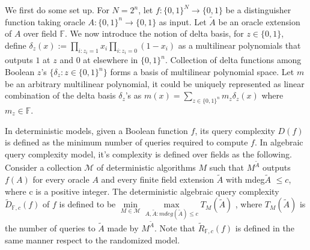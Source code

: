 \documentclass{article}
\begin{document}
  We first do some set up. For $N=2^n$, let $f:\{0,1\}^N\rightarrow\{0,1\}$ be a distinguisher function taking oracle $A: \{0,1\}^n \rightarrow \{0,1\}$ as input. Let $\tilde{A}$ be an oracle extension of $A$ over field $\mathbb{F}$. We now introduce the notion of delta basis, for $z\in\{0,1\}$, define $\delta_z(x) := \prod\limits_{i:z_i=1}x_i \prod\limits_{i:z_i=0}(1-x_i)$ as a multilinear polynomials that outputs $1$ at $z$ and $0$ at elsewhere in $\{0,1\}^n$. Collection of delta functions among Boolean $z$'s $\{\delta_z:z\in\{0,1\}^n\}$ forms a basis of multilinear polynomial space. Let $m$ be an arbitrary multilinear polynomial, it could be uniquely represented as linear combination of the delta basis $\delta_z$'s as $m(x) = \sum\limits_{z\in \{0,1\}^n}m_z\delta_z(x)$ where $m_z\in\mathbb{F}$.
  
  In deterministic models, given a Boolean function $f$, its query complexity $D(f)$ is defined as the minimum number of queries required to compute $f$. In algebraic query complexity model, it's complexity is defined over fields as the following. Consider a collection $\mathcal{M}$ of deterministic algorithms $M$ such that $M^{\tilde{A}}$ outputs $f(A)$ for every oracle $A$ and every finite field extension $\tilde{A}$ with mdeg{$\tilde{A}$} $\le c$, where c is a positive integer. The deterministic algebraic query complexity $\tilde{D}_{\mathbb{F},c}(f)$ of $f$ is defined to be $\min\limits_{M \in \mathcal{M}} \max\limits_{A,\tilde{A}: mdeg(\tilde{A}) \le c} T_M(\tilde{A})$ , where $T_M(\tilde{A})$ is the number of queries to $\tilde{A}$ made by $M^{\tilde{A}}$. Note that $\tilde{R}_{\mathbb{F},c}(f)$ is defined in the same manner respect to the randomized model.
  
\end{document}
